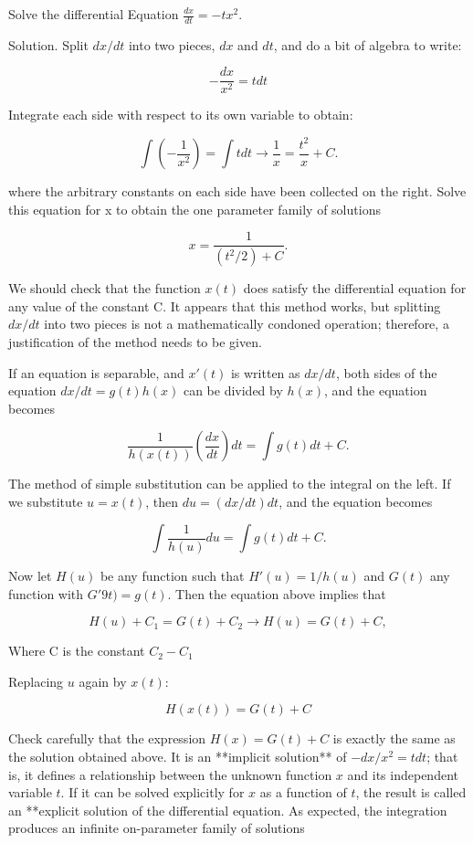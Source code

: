   \begin{problem}
    Solve the differential Equation $\frac{dx}{dt}=-tx^2$.

    Solution. Split $dx/dt$ into two pieces, $dx$ and $dt$, and do a bit of algebra to write:

    \[
      - \frac{dx}{x^2} = tdt
    \]

    Integrate each side with respect to its own variable to obtain:

    \[
      \int \left( - \frac{1}{x^2}\right) =\int tdt\to \frac{1}{x} = \frac{t^2}{x} + C.
    \]

    where the arbitrary constants on each side have been collected on the right. Solve this equation for x to obtain the one parameter family of solutions

    \[
      x=\frac{1}{(t^2/2)+C}.
    \]

    We should check that the function $x(t)$ does satisfy the differential equation for any value of the constant C. It appears that this method works, but splitting $dx/dt$ into two pieces is not a mathematically condoned operation; therefore, a justification of the method needs to be given.

    If an equation is separable, and $x'(t)$ is written as $dx/dt$, both sides of the equation $dx/dt=g(t)h(x)$ can be divided by $h(x)$, and the equation becomes

    \[
      \frac{1}{h(x(t))}\left(\frac{dx}{dt}\right)dt=\int g(t)dt+C.
    \]

    The method of simple substitution can be applied to the integral on the left. If we substitute $u=x(t)$, then $du=(dx/dt)dt$, and the equation becomes

    \[
      \int\frac{1}{h(u)}du=\int g(t)dt+C.
    \]

    Now let $H(u)$ be any function such that $H'(u)=1/h(u)$ and $G(t)$ any function with $G'9t)=g(t)$. Then the equation above implies that

    \[
      H(u)+C_1=G(t)+C_2\to H(u)=G(t)+C,
    \]

    Where C is the constant $C_2-C_1$

    Replacing $u$ again by $x(t)$:

    \[
      H(x(t))=G(t)+ C
    \]
  \end{problem}

  Check carefully that the expression $H(x)=G(t)+C$ is exactly the same as the solution obtained above. It is an **implicit solution** of $-dx/x^2=tdt$; that is, it defines a relationship between the unknown function $x$ and its independent variable $t$. If it can be solved explicitly for $x$ as a function of $t$, the result is called an **explicit solution of the differential equation. As expected, the integration produces an infinite on-parameter family of solutions

